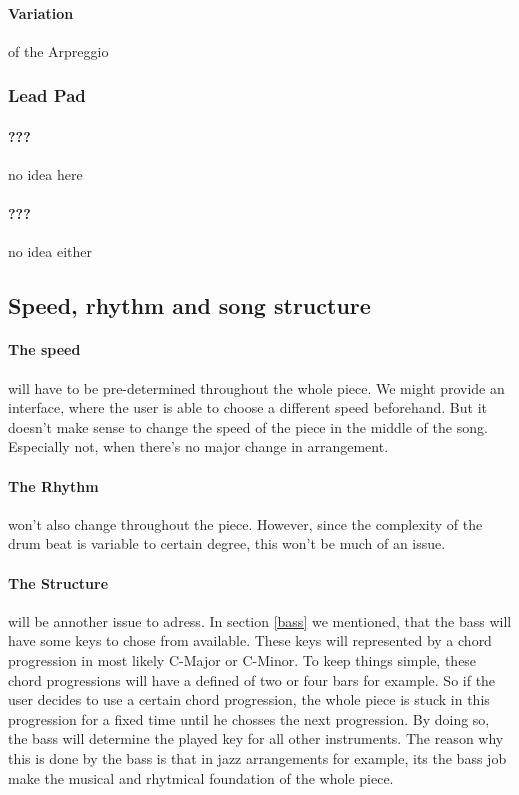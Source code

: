 \documentclass[titlepage, a4paper, 11pt]{scrartcl}
\begin{document}
\paragraph{Variation} of the Arpreggio

\subsubsection{Lead Pad}

\paragraph{???} no idea here
\paragraph{???} no idea either

\subsection{Speed, rhythm and song structure}

\paragraph{The speed} will have to be pre-determined throughout the whole piece. We might provide an interface, where the user is able to choose a different speed beforehand.
But it doesn't make sense to change the speed of the piece in the middle of the song. Especially not, when there's no major change in arrangement.

\paragraph{The Rhythm} won't also change throughout the piece. However, since the complexity of the drum beat is variable to certain degree,
this won't be much of an issue.

\paragraph{The Structure} will be annother issue to adress. In section \ref{bass} we mentioned, that the bass will have some keys to chose from available.
These keys will represented by a chord progression in most likely C-Major or C-Minor. To keep things simple, these chord progressions will
have a defined of two or four bars for example. So if the user decides to use a certain chord progression, the whole piece is stuck in this progression
for a fixed time until he chosses the next progression. By doing so, the bass will determine the played key for all other instruments.
The reason why this is done by the bass is that in jazz arrangements for example, its the bass job make the musical and rhytmical foundation of the whole piece.
\end{document}
